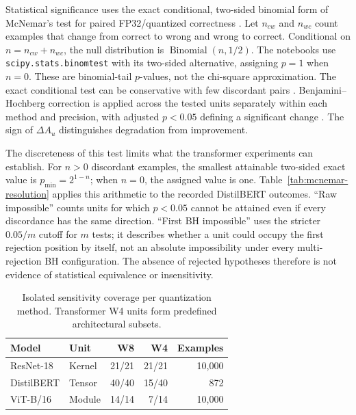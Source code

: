 \documentclass[conference]{IEEEtran}
\begin{document}
Statistical significance uses the exact conditional, two-sided binomial form of McNemar's test for paired FP32/quantized correctness \cite{fagerland2013}. Let $n_{cw}$ and $n_{wc}$ count examples that change from correct to wrong and wrong to correct. Conditional on $n=n_{cw}+n_{wc}$, the null distribution is $\operatorname{Binomial}(n,1/2)$. The notebooks use \texttt{scipy.stats.binomtest} with its two-sided alternative, assigning $p=1$ when $n=0$. These are binomial-tail $p$-values, not the chi-square approximation. The exact conditional test can be conservative with few discordant pairs \cite{fagerland2013}. Benjamini--Hochberg correction is applied across the tested units separately within each method and precision, with adjusted $p<0.05$ defining a significant change \cite{benjamini1995}. The sign of $\Delta A_u$ distinguishes degradation from improvement.

The discreteness of this test limits what the transformer experiments can establish. For $n>0$ discordant examples, the smallest attainable two-sided exact value is $p_{\min}=2^{1-n}$; when $n=0$, the assigned value is one. Table~\ref{tab:mcnemar-resolution} applies this arithmetic to the recorded DistilBERT outcomes. ``Raw impossible'' counts units for which $p<0.05$ cannot be attained even if every discordance has the same direction. ``First BH impossible'' uses the stricter $0.05/m$ cutoff for $m$ tests; it describes whether a unit could occupy the first rejection position by itself, not an absolute impossibility under every multi-rejection BH configuration. The absence of rejected hypotheses therefore is not evidence of statistical equivalence or insensitivity.

\begin{table}[!t]
\centering
\caption{Isolated sensitivity coverage per quantization method. Transformer W4 units form predefined architectural subsets.}
\label{tab:sensitivity-coverage}
\scriptsize
\setlength{\tabcolsep}{3pt}
\begin{tabular}{@{}llrrr@{}}
\toprule
Model & Unit & W8 & W4 & Examples \\
\midrule
ResNet-18 & Kernel & 21/21 & 21/21 & 10,000 \\
DistilBERT & Tensor & 40/40 & 15/40 & 872 \\
ViT-B/16 & Module & 14/14 & 7/14 & 10,000 \\
\bottomrule
\end{tabular}
\end{table}
\end{document}
